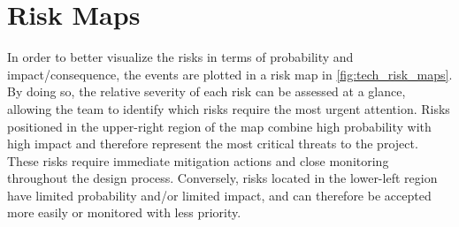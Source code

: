 \section{Risk Maps}
In order to better visualize the risks in terms of probability and impact/consequence, the events are plotted in a risk map in \autoref{fig:tech_risk_maps}. By doing so, the relative severity of each risk can be assessed at a glance, allowing the team to identify which risks require the most urgent attention. Risks positioned in the upper-right region of the map combine high probability with high impact and therefore represent the most critical threats to the project. These risks require immediate mitigation actions and close monitoring throughout the design process. Conversely, risks located in the lower-left region have limited probability and/or limited impact, and can therefore be accepted more easily or monitored with less priority.\\

